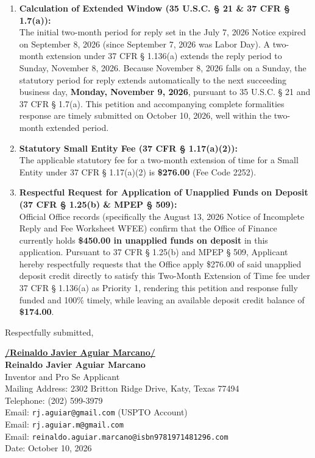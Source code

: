 \documentclass[11pt,letterpaper]{article}
\begin{document}
\begin{enumerate}[leftmargin=*]
    \item \textbf{Calculation of Extended Window (35 U.S.C. \S{} 21 \& 37 CFR \S{} 1.7(a)):} \\
    The initial two-month period for reply set in the July 7, 2026 Notice expired on September 8, 2026 (since September 7, 2026 was Labor Day). A two-month extension under 37 CFR \S{} 1.136(a) extends the reply period to Sunday, November 8, 2026. Because November 8, 2026 falls on a Sunday, the statutory period for reply extends automatically to the next succeeding business day, \textbf{Monday, November 9, 2026}, pursuant to 35 U.S.C. \S{} 21 and 37 CFR \S{} 1.7(a). This petition and accompanying complete formalities response are timely submitted on October 10, 2026, well within the two-month extended period.

    \item \textbf{Statutory Small Entity Fee (37 CFR \S{} 1.17(a)(2)):} \\
    The applicable statutory fee for a two-month extension of time for a Small Entity under 37 CFR \S{} 1.17(a)(2) is \textbf{\$276.00} (Fee Code 2252).

    \item \textbf{Respectful Request for Application of Unapplied Funds on Deposit (37 CFR \S{} 1.25(b) \& MPEP \S{} 509):} \\
    Official Office records (specifically the August 13, 2026 Notice of Incomplete Reply and Fee Worksheet WFEE) confirm that the Office of Finance currently holds \textbf{\$450.00 in unapplied funds on deposit} in this application. Pursuant to 37 CFR \S{} 1.25(b) and MPEP \S{} 509, Applicant hereby respectfully requests that the Office apply \$276.00 of said unapplied deposit credit directly to satisfy this Two-Month Extension of Time fee under 37 CFR \S{} 1.136(a) as Priority 1, rendering this petition and response fully funded and 100\% timely, while leaving an available deposit credit balance of \textbf{\$174.00}.
\end{enumerate}

\vspace{0.6cm}
\begin{singlespace}
\noindent Respectfully submitted, \par\vspace{0.8cm}
\underline{\textbf{/Reinaldo Javier Aguiar Marcano/}} \\
\textbf{Reinaldo Javier Aguiar Marcano} \\
Inventor and Pro Se Applicant \\
Mailing Address: 2302 Britton Ridge Drive, Katy, Texas 77494 \\
Telephone: (202) 599-3979 \\
Email: \texttt{rj.aguiar@gmail.com} (USPTO Account) \\
Email: \texttt{rj.aguiar.m@gmail.com} \\
Email: \texttt{reinaldo.aguiar.marcano@isbn9781971481296.com} \\
Date: October 10, 2026
\end{singlespace}
\end{document}
